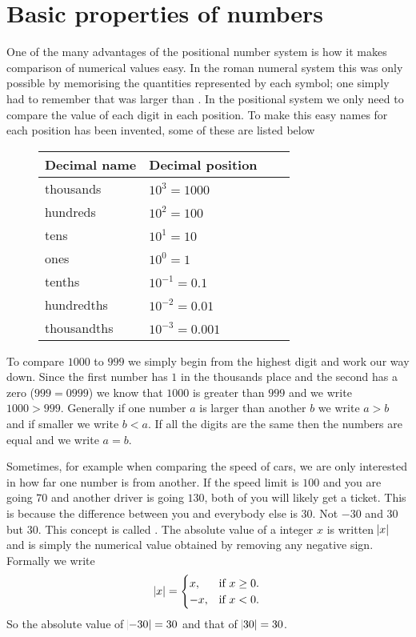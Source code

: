 \section{Basic properties of numbers}
One of the many advantages of the positional number system is how it makes comparison of numerical values easy. In the roman numeral system this was only possible by memorising the quantities represented by each symbol; one simply had to remember that  was larger than . In the positional system we only need to compare the value of each digit in each position. To make this easy names for each position has been invented, some of these are listed below
\begin{figure}[H]
\centering
\begin{tabular}{|l|l|l|l|}
\hline
\textbf{Decimal name} & \textbf{Decimal position}  \\ \hline
thousands	         & $10^3 = 1000$               \\ \hline
hundreds	             & $10^2 = 100$                \\ \hline
tens	                 & $10^1 = 10$                 \\ \hline
ones	                 & $10^0 = 1$                  \\ \hline
tenths	             & $10^{-1} = 0.1$             \\ \hline
hundredths	        & $10^{-2} = 0.01$             \\ \hline
thousandths	        & $10^{-3} = 0.001$           \\ \hline
\end{tabular}
\end{figure}
To compare $1000$ to $999$ we simply begin from the highest digit and work our way down. Since the first number has $1$ in the thousands place and the second has a zero ($999= 0999$) we know that $1000$ is greater than $999$ and we write $1000>999$. Generally if one number $a$ is larger than another $b$ we write $a > b$ and if smaller we write $b < a$. If all the digits are the same then the numbers are equal and we write $a=b$. 

\myindent Sometimes, for example when comparing the speed of cars, we are only interested in how far one number is from another. If the speed limit is $100$ and you are going $70$ and another driver is going $130$, both of you will likely get a ticket. This is because the difference between you and everybody else is $30$. Not $-30$ and $30$ but $30$. This concept is called . The absolute value of a integer $x$ is written $\abs{x}$ and is simply the numerical value obtained by removing any negative sign. Formally we write
\begin{equation}
  \abs{x}=\begin{cases}
    x, & \text{if $x \geq 0$.}\\
   -x, & \text{if $x < 0$.}
  \end{cases}
\end{equation}
So the absolute value of $\abs{-30} = 30$ and that of $\abs{30} = 30$. 

